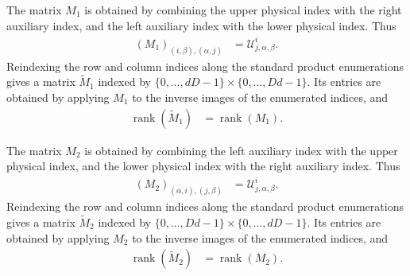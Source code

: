 \begin{definition}
    \label{def:mpu_source_matrix_one}
    \leanok
    The matrix $M_1$ is obtained by combining the upper physical index with the
    right auxiliary index, and the left auxiliary index with the lower physical
    index. Thus
    \begin{align}
        (M_1)_{(i,\beta),(\alpha,j)}
         & = \mathcal U^i_{j,\alpha,\beta}.
    \end{align}
    Reindexing the row and column indices along the standard product
    enumerations gives a matrix $\widetilde M_1$ indexed by
    $\{0,\ldots,dD-1\}\times\{0,\ldots,Dd-1\}$. Its entries are obtained by
    applying $M_1$ to the inverse images of the enumerated indices, and
    \begin{align}
        \operatorname{rank}(\widetilde M_1)
         & = \operatorname{rank}(M_1).
    \end{align}
\end{definition}

\begin{definition}
    \label{def:mpu_source_matrix_two}
    \leanok
    The matrix $M_2$ is obtained by combining the left auxiliary index with the
    upper physical index, and the lower physical index with the right auxiliary
    index. Thus
    \begin{align}
        (M_2)_{(\alpha,i),(j,\beta)}
         & = \mathcal U^i_{j,\alpha,\beta}.
    \end{align}
    Reindexing the row and column indices along the standard product
    enumerations gives a matrix $\widetilde M_2$ indexed by
    $\{0,\ldots,Dd-1\}\times\{0,\ldots,dD-1\}$. Its entries are obtained by
    applying $M_2$ to the inverse images of the enumerated indices, and
    \begin{align}
        \operatorname{rank}(\widetilde M_2)
         & = \operatorname{rank}(M_2).
    \end{align}
\end{definition}

